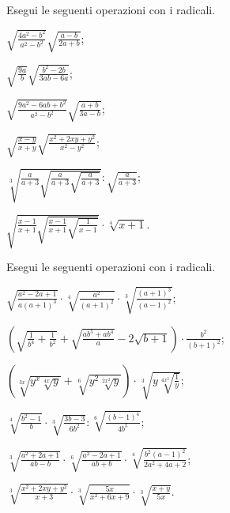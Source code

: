 \begin{esercizio}[\Ast]
 \label{ese:2.62}
Esegui le seguenti operazioni con i radicali.
 \begin{multicols}{2}
 \begin{enumeratea}
 \item $\sqrt{\frac{4a^2-b^2}{a^2-b^2}}\sqrt{\frac{a-b}{2a+b}}$;
 \item $\sqrt{\frac {9a}{b}}\sqrt{\frac{b^2-2b}{3ab-6a}}$;
 \item $\sqrt{\frac{9a^2-6ab+b^2}{a^2-b^2}}\sqrt{\frac{a+b}{3a-b}}$;
 \item $\sqrt{\frac{x-y}{x+y}}\sqrt{\frac{x^2+2xy+y^2}{x^2-y^2}}$;
 \item $\sqrt[3]{\frac a{a+3}\sqrt{\frac a{a+3}\sqrt{\frac a{a+3}}}}:\sqrt{\frac a{a+3}}$;
 \item $\sqrt{\frac{x-1}{x+1}\sqrt{\frac{x-1}{x+1}\sqrt{\frac 1{x-1}}}}\cdot \sqrt[4]{x+1}$.
 \end{enumeratea}
 \end{multicols}
\end{esercizio}

\begin{esercizio}[\Ast]
 \label{ese:2.63}
Esegui le seguenti operazioni con i radicali.
 \begin{enumeratea}
 \item $\sqrt{\frac{a^2-2a+1}{a(a+1)^3}}\cdot \sqrt[4]{\frac{a^2}{(a+1)^2}}\cdot \sqrt[3]{\frac{(a+1)^3}{(a-1)^2}}$;
 \item $\left(\sqrt{\frac 1{b^4}+\frac 1{b^2}}+\sqrt{\frac{ab^5+ab^4} a}-2\sqrt{b+1}\right)\cdot \frac{b^2}{(b+1)^2}$;
 \item $\left(\sqrt[3x]{y^x\sqrt[4x]y}+\sqrt[6]{y^2\sqrt[2x^2]y}\right)\cdot \sqrt[3]{y\sqrt[4x^2]{\frac 1 y}}$;
 \item $\sqrt[4]{\frac{b^2-1} b}\cdot \sqrt[3]{\frac{3b-3}{6b^2}}:\sqrt[6]{\frac{(b-1)^4}{4b^5}}$;
 \item $\sqrt[3]{\frac{a^2+2a+1}{ab-b}}\cdot \sqrt[6]{\frac{a^2-2a+1}{ab+b}}\cdot \sqrt[4]{\frac{b^2(a-1)^2}{2a^2+4a+2}}$;
 \item $\sqrt[3]{\frac{x^2+2xy+y^2}{x+3}}\cdot \sqrt[3]{\frac{5x}{x^2+6x+9}}\cdot \sqrt[3]{\frac{x+y}{5x}}$.
 \end{enumeratea}
\end{esercizio}

